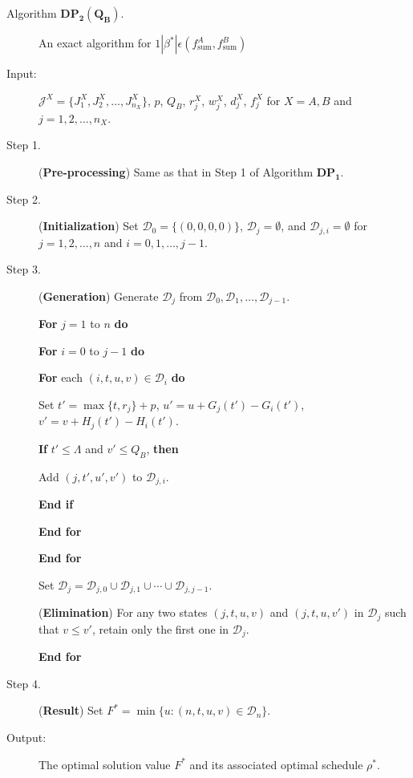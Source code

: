 \documentclass[12pt]{article}
\begin{document}
\begin{sloppypar}
\begin{description}
\item [Algorithm $\mathbf{DP_2(Q_B)}$.] An exact algorithm for $1 | \beta^{*}|\epsilon(f_{\mathrm{sum}}^A, f_{\mathrm{sum}}^B)$

\item [Input:] ${\mathcal J}^{X}=\{J_1^{X}, J_2^{X}, \ldots, J_{n_X}^{X}\}$, $p$, $Q_B$, $r_j^X$, $w_j^X$, $d_j^X$, $f_j^X$ for $X = A,B$ and $j=1, 2, \ldots, n_X$.

\item [Step 1.] (\textbf{Pre-processing}) Same as that in Step 1 of Algorithm $\mathbf{DP_1}$.

\item [Step 2.] (\textbf{Initialization}) Set $\mathcal{D}_0=\{(0,0,0,0)\}$, ${\mathcal D}_j=\emptyset$, and $\mathcal{D}_{j,i}=\emptyset$ for $j=1, 2, \ldots, n$ and $i=0, 1, \ldots, j-1$.

\item [Step 3.] (\textbf{Generation}) Generate ${\mathcal D}_j$ from ${\mathcal D}_0, {\mathcal D}_1, \ldots, {\mathcal D}_{j-1}$.

\textbf{For} $j=1$ to $n$ \textbf{do}

\quad \textbf{For} $i=0$ to $j-1$ \textbf{do}

\qquad \textbf{For} each $(i, t, u, v) \in \mathcal{D}_i$ \textbf{do}

\quad \qquad Set $t'=\max\{t, r_j\}+p$, $u'=u+G_j(t')-G_i(t')$, $v'=v+H_j(t')-H_i(t')$.

\quad \qquad \textbf{If} $t' \leq \Lambda$ and $v' \leq Q_B$, \textbf{then}

\quad \qquad \qquad Add $(j, t', u', v')$ to $\mathcal{D}_{j,i}$.

\quad \qquad \textbf{End if}

\qquad \textbf{End for}

\quad \textbf{End for}

\quad Set $\mathcal{D}_j=\mathcal{D}_{j,0} \cup \mathcal{D}_{j,1} \cup \cdots \cup \mathcal{D}_{j,j-1}$.

\quad (\textbf{Elimination})  For any two states $(j, t, u, v)$ and $(j, t, u, v')$ in $\mathcal{D}_j$ such that $v \leq v'$, retain only the first one in $\mathcal{D}_j$.

\textbf{End for}

\item [Step 4.] (\textbf{Result}) Set $F^{*}=\min\{u: (n, t, u, v) \in \mathcal{D}_n\}$.

\item [Output:] The optimal solution value $F^{*}$ and its associated optimal schedule $\rho^{*}$.
\end{description}


\end{sloppypar}
\end{document}
